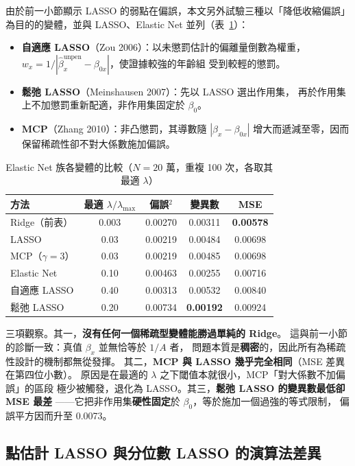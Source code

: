 \documentclass[UTF8, fontset=macnew, a4paper, 12pt]{ctexart}
\begin{document}
由於前一小節顯示 LASSO 的弱點在偏誤，本文另外試驗三種以「降低收縮偏誤」
為目的的變體，並與 LASSO、Elastic Net 並列（表~\ref{tab:envar}）：

\begin{itemize}
  \item \textbf{自適應 LASSO}（Zou 2006）：以未懲罰估計的偏離量倒數為權重，
        $w_x=1/|\hat\beta_x^{\text{unpen}}-\beta_{0x}|$，使證據較強的年齡組
        受到較輕的懲罰。
  \item \textbf{鬆弛 LASSO}（Meinshausen 2007）：先以 LASSO 選出作用集，
        再於作用集上不加懲罰重新配適，非作用集固定於 $\beta_0$。
  \item \textbf{MCP}（Zhang 2010）：非凸懲罰，其導數隨 $|\beta_x-\beta_{0x}|$
        增大而遞減至零，因而保留稀疏性卻不對大係數施加偏誤。
\end{itemize}

\begin{table}[H]
\centering
\caption{Elastic Net 族各變體的比較（$N=20$ 萬，重複 100 次，各取其最適 $\lambda$）}
\small
\begin{tabular}{lcccc}
\toprule
方法 & 最適 $\lambda/\lambda_{\max}$ & 偏誤$^2$ & 變異數 & MSE\\
\midrule
Ridge（前表） & 0.003 & 0.00270 & 0.00311 & \textbf{0.00578}\\
LASSO & 0.03 & 0.00219 & 0.00484 & 0.00698\\
MCP（$\gamma=3$） & 0.03 & 0.00219 & 0.00485 & 0.00698\\
Elastic Net & 0.10 & 0.00463 & 0.00255 & 0.00716\\
自適應 LASSO & 0.40 & 0.00313 & 0.00532 & 0.00840\\
鬆弛 LASSO & 0.20 & 0.00734 & \textbf{0.00192} & 0.00924\\
\bottomrule
\end{tabular}
\label{tab:envar}
\end{table}

三項觀察。其一，\textbf{沒有任何一個稀疏型變體能勝過單純的 Ridge}。
這與前一小節的診斷一致：真值 $\beta_x$ 並無恰等於 $1/A$ 者，
問題本質是\textbf{稠密}的，因此所有為稀疏性設計的機制都無從發揮。
其二，\textbf{MCP 與 LASSO 幾乎完全相同}（MSE 差異在第四位小數）。
原因是在最適的 $\lambda$ 之下閾值本就很小，MCP「對大係數不加偏誤」的區段
極少被觸發，退化為 LASSO。其三，\textbf{鬆弛 LASSO 的變異數最低卻 MSE 最差}
——它把非作用集\textbf{硬性固定}於 $\beta_0$，等於施加一個過強的等式限制，
偏誤平方因而升至 0.0073。

\subsection{點估計 LASSO 與分位數 LASSO 的演算法差異}\label{sec:algodiff}
\end{document}
